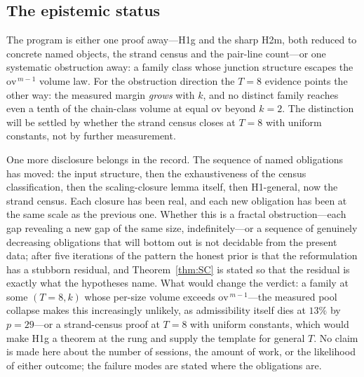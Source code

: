 \subsection{The epistemic status}\label{sec:scale-status}

The program is either one proof away---H1g and the sharp H2m, both
reduced to concrete named objects, the strand census and the pair-line
count---or one systematic obstruction away: a family class whose
junction structure escapes the $\mathrm{ov}^{\,m-1}$ volume law. For
the obstruction direction the $T=8$ evidence points the other way: the
measured margin \emph{grows} with $k$, and no distinct family reaches
even a tenth of the chain-class volume at equal $\mathrm{ov}$ beyond
$k=2$. The distinction will be settled by whether the strand census
closes at $T=8$ with uniform constants, not by further measurement.

One more disclosure belongs in the record. The sequence of named
obligations has moved: the input structure, then the exhaustiveness of
the census classification, then the scaling-closure lemma itself, then
H1-general, now the strand census. Each closure has been real, and
each new obligation has been at the same scale as the previous one.
Whether this is a fractal obstruction---each gap revealing a new gap of
the same size, indefinitely---or a sequence of genuinely decreasing
obligations that will bottom out is not decidable from the present
data; after five iterations of the pattern the honest prior is that
the reformulation has a stubborn residual, and Theorem~\ref{thm:SC} is
stated so that the residual is exactly what the hypotheses name. What
would change the verdict: a family at some $(T=8,k)$ whose per-size
volume exceeds $\mathrm{ov}^{\,m-1}$---the measured pool collapse
makes this increasingly unlikely, as admissibility itself dies at
$13\%$ by $p=29$---or a strand-census proof at $T=8$ with uniform
constants, which would make H1g a theorem at the rung and supply the
template for general $T$. No claim is made here about the number of
sessions, the amount of work, or the likelihood of either outcome; the
failure modes are stated where the obligations are.

